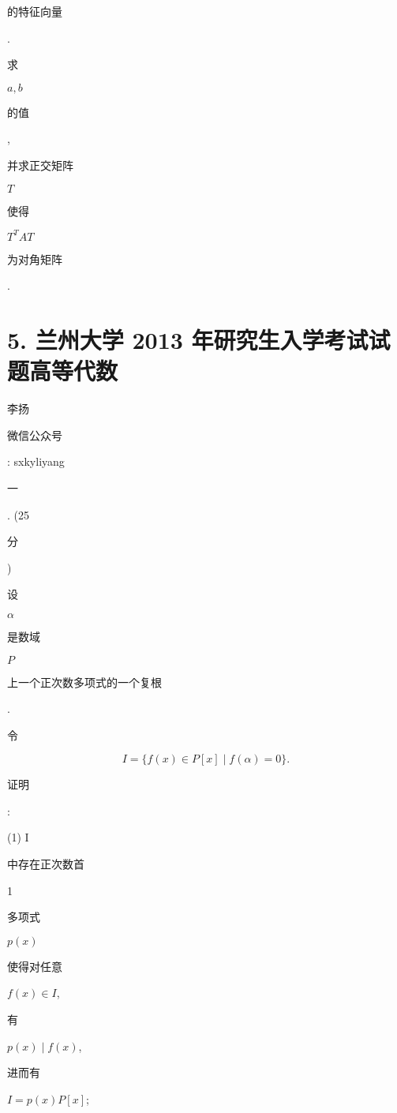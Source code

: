 \documentclass[10pt]{article}
\begin{document}
\begin{CJK}{UTF8}{mj}的特征向量\end{CJK}. \begin{CJK}{UTF8}{mj}求\end{CJK} $a, b$ \begin{CJK}{UTF8}{mj}的值\end{CJK}, \begin{CJK}{UTF8}{mj}并求正交矩阵\end{CJK} $T$ \begin{CJK}{UTF8}{mj}使得\end{CJK} $T^{T} A T$ \begin{CJK}{UTF8}{mj}为对角矩阵\end{CJK}.

\section{5. 兰州大学 2013 年研究生入学考试试题高等代数}
\begin{CJK}{UTF8}{mj}李扬\end{CJK}

\begin{CJK}{UTF8}{mj}微信公众号\end{CJK}: sxkyliyang

\begin{CJK}{UTF8}{mj}一\end{CJK}. (25 \begin{CJK}{UTF8}{mj}分\end{CJK}) \begin{CJK}{UTF8}{mj}设\end{CJK} $\alpha$ \begin{CJK}{UTF8}{mj}是数域\end{CJK} $P$ \begin{CJK}{UTF8}{mj}上一个正次数多项式的一个复根\end{CJK}. \begin{CJK}{UTF8}{mj}令\end{CJK}
$$
I=\{f(x) \in P[x] \mid f(\alpha)=0\} .
$$
\begin{CJK}{UTF8}{mj}证明\end{CJK}:

(1) I \begin{CJK}{UTF8}{mj}中存在正次数首\end{CJK} 1 \begin{CJK}{UTF8}{mj}多项式\end{CJK} $p(x)$ \begin{CJK}{UTF8}{mj}使得对任意\end{CJK} $f(x) \in I$, \begin{CJK}{UTF8}{mj}有\end{CJK} $p(x) \mid f(x)$, \begin{CJK}{UTF8}{mj}进而有\end{CJK} $I=p(x) P[x]$;
\end{document}
